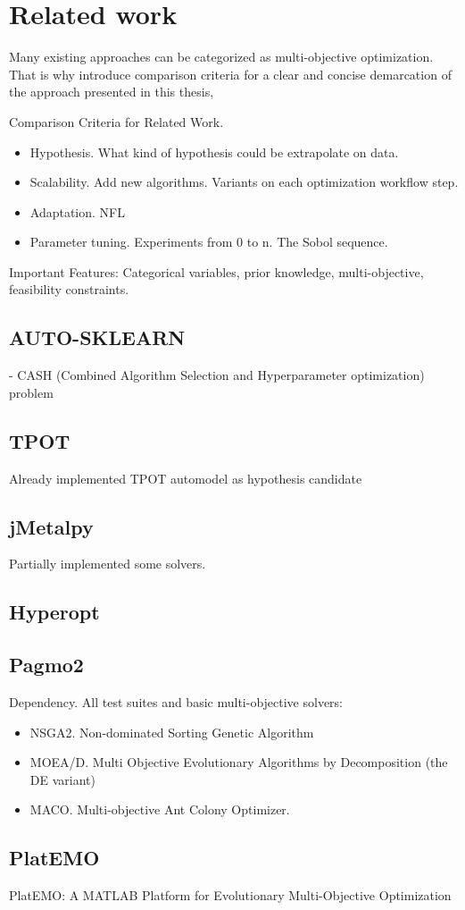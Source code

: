 \chapter{Related work}
    Many existing approaches can be categorized as multi-objective optimization. That is why
    introduce comparison criteria for a clear and concise demarcation of the approach presented in this thesis, 

    Comparison Criteria for Related Work. 
    \begin{itemize}
        \item Hypothesis. What kind of hypothesis could be extrapolate on data.
        \item Scalability. Add new algorithms. Variants on each optimization workflow step.
        \item Adaptation. NFL
        \item Parameter tuning. Experiments from 0 to n. The Sobol sequence.                
    \end{itemize}
    Important Features: Categorical variables, prior knowledge, multi-objective, feasibility constraints.

    \section{AUTO-SKLEARN} \cite{autosklearn:feurer2015efficient}
    - CASH (Combined Algorithm Selection and Hyperparameter optimization) problem

    \section{TPOT} \cite{OlsonGECCO2016}
    Already implemented TPOT automodel as hypothesis candidate

    \section{jMetalpy} \cite{benitezhidalgo2019jmetalpy}
    Partially implemented some solvers.

    \section{Hyperopt}

    \section{Pagmo2} \cite{francesco_biscani_2019_3582877}
    Dependency.
    All test suites and basic multi-objective solvers:
    \begin{itemize}
        \item NSGA2. Non-dominated Sorting Genetic Algorithm
        \item MOEA/D. Multi Objective Evolutionary Algorithms by Decomposition (the DE variant)
        \item MACO. Multi-objective Ant Colony Optimizer.
    \end{itemize}

    \section{PlatEMO} \cite{PlatEMO}
    PlatEMO: A MATLAB Platform for Evolutionary Multi-Objective Optimization
